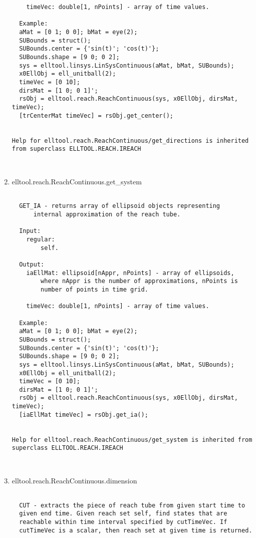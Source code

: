 \begin{enumerate}
\begin{lstlisting}
    timeVec: double[1, nPoints] - array of time values.

  Example:
  aMat = [0 1; 0 0]; bMat = eye(2);
  SUBounds = struct();
  SUBounds.center = {'sin(t)'; 'cos(t)'};
  SUBounds.shape = [9 0; 0 2];
  sys = elltool.linsys.LinSysContinuous(aMat, bMat, SUBounds);
  x0EllObj = ell_unitball(2);
  timeVec = [0 10];
  dirsMat = [1 0; 0 1]';
  rsObj = elltool.reach.ReachContinuous(sys, x0EllObj, dirsMat, timeVec);
  [trCenterMat timeVec] = rsObj.get_center();


Help for elltool.reach.ReachContinuous/get_directions is inherited from superclass ELLTOOL.REACH.IREACH



\end{lstlisting}
\fontfamily{\familydefault}
\selectfont
\item {elltool.reach.ReachContinuous.get\_system}
\selectfont
\begin{lstlisting}

  GET_IA - returns array of ellipsoid objects representing
      internal approximation of the reach tube.

  Input:
    regular:
        self.

  Output:
    iaEllMat: ellipsoid[nAppr, nPoints] - array of ellipsoids,
        where nAppr is the number of approximations, nPoints is
        number of points in time grid.

    timeVec: double[1, nPoints] - array of time values.

  Example:
  aMat = [0 1; 0 0]; bMat = eye(2);
  SUBounds = struct();
  SUBounds.center = {'sin(t)'; 'cos(t)'};
  SUBounds.shape = [9 0; 0 2];
  sys = elltool.linsys.LinSysContinuous(aMat, bMat, SUBounds);
  x0EllObj = ell_unitball(2);
  timeVec = [0 10];
  dirsMat = [1 0; 0 1]';
  rsObj = elltool.reach.ReachContinuous(sys, x0EllObj, dirsMat, timeVec);
  [iaEllMat timeVec] = rsObj.get_ia();


Help for elltool.reach.ReachContinuous/get_system is inherited from superclass ELLTOOL.REACH.IREACH



\end{lstlisting}
\fontfamily{\familydefault}
\selectfont
\item {elltool.reach.ReachContinuous.dimension}
\selectfont
\begin{lstlisting}

  CUT - extracts the piece of reach tube from given start time to
  given end time. Given reach set self, find states that are
  reachable within time interval specified by cutTimeVec. If
  cutTimeVec is a scalar, then reach set at given time is returned.


\end{lstlisting}
\end{enumerate}
